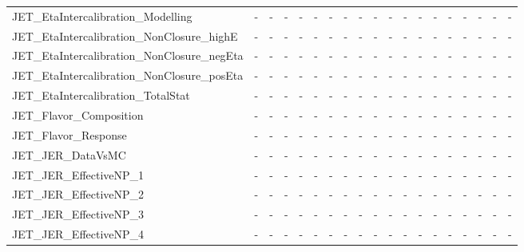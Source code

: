\begin{table}[h]
{\begin{tabular}{l | cccccccccccccccccc}
JET\_EtaIntercalibration\_Modelling         &     - &     - &     - &     - &     - &     - &     - &     - &     - &     - &     - &     - &     - &     - &     - &     - &     - &     - \\
JET\_EtaIntercalibration\_NonClosure\_highE  &     - &     - &     - &     - &     - &     - &     - &     - &     - &     - &     - &     - &     - &     - &     - &     - &     - &     - \\
JET\_EtaIntercalibration\_NonClosure\_negEta &     - &     - &     - &     - &     - &     - &     - &     - &     - &     - &     - &     - &     - &     - &     - &     - &     - &     - \\
JET\_EtaIntercalibration\_NonClosure\_posEta &     - &     - &     - &     - &     - &     - &     - &     - &     - &     - &     - &     - &     - &     - &     - &     - &     - &     - \\
JET\_EtaIntercalibration\_TotalStat         &     - &     - &     - &     - &     - &     - &     - &     - &     - &     - &     - &     - &     - &     - &     - &     - &     - &     - \\
JET\_Flavor\_Composition                    &     - &     - &     - &     - &     - &     - &     - &     - &     - &     - &     - &     - &     - &     - &     - &     - &     - &     - \\
JET\_Flavor\_Response                       &     - &     - &     - &     - &     - &     - &     - &     - &     - &     - &     - &     - &     - &     - &     - &     - &     - &     - \\
JET\_JER\_DataVsMC                          &     - &     - &     - &     - &     - &     - &     - &     - &     - &     - &     - &     - &     - &     - &     - &     - &     - &     - \\
JET\_JER\_EffectiveNP\_1                     &     - &     - &     - &     - &     - &     - &     - &     - &     - &     - &     - &     - &     - &     - &     - &     - &     - &     - \\
JET\_JER\_EffectiveNP\_2                     &     - &     - &     - &     - &     - &     - &     - &     - &     - &     - &     - &     - &     - &     - &     - &     - &     - &     - \\
JET\_JER\_EffectiveNP\_3                     &     - &     - &     - &     - &     - &     - &     - &     - &     - &     - &     - &     - &     - &     - &     - &     - &     - &     - \\
JET\_JER\_EffectiveNP\_4                     &     - &     - &     - &     - &     - &     - &     - &     - &     - &     - &     - &     - &     - &     - &     - &     - &     - &     - \\

\end{tabular}}
\end{table}
